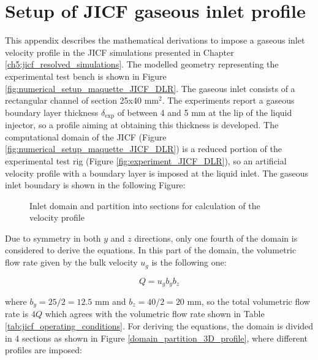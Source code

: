 \chapter{Setup of JICF gaseous inlet profile}
\label{app:JICF_BL_setup}

This appendix describes the mathematical derivations to impose a gaseous inlet velocity profile in the JICF simulations presented in Chapter \ref{ch5:jicf_resolved_simulations}. The modelled geometry representing the experimental test bench is shown in Figure \ref{fig:numerical_setup_maquette_JICF_DLR}. The gaseous inlet consists of a rectangular channel of section 25x40 mm$^2$. The experiments  report a gaseous boundary layer thickness $\delta_\mathrm{exp}$ of between 4 and 5 mm at the lip of the liquid injector, so a profile aiming at obtaining this thickness is developed. The computational domain of the JICF (Figure \ref{fig:numerical_setup_maquette_JICF_DLR}) is a reduced portion of the experimental test rig (Figure \ref{fig:experiment_JICF_DLR}), so an artificial velocity profile with a boundary layer is imposed at the liquid inlet. The gaseous inlet boundary is shown in the following Figure:


\begin{figure}[h!]	
	\centering
%	
	\caption{Inlet domain and partition into sections for calculation of the velocity profile}
	\label{fig:domain_partition_3D_profile}
\end{figure}



Due to symmetry in both $y$ and $z$ directions, only one fourth of the domain is considered to derive the equations. In this part of the domain, the volumetric flow rate given by the bulk velocity $u_g$ is the following one:

\begin{equation}
\label{eq:volumetric_flow_rate_2D}
Q = u_g b_y b_z
\end{equation}	

where $b_y = 25/2 = 12.5$ mm and $b_z = 40/2 = 20$ mm, so the total volumetric flow rate is $4Q$ which agrees with the volumetric flow rate shown in Table \ref{tab:jicf_operating_conditions}. For deriving the equations, the domain is divided in 4 sections as shown in Figure \ref{domain_partition_3D_profile}, where different profiles are imposed:

